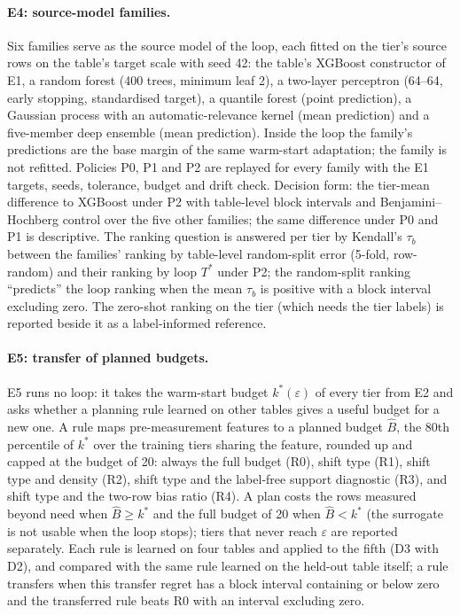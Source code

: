 \documentclass[11pt,a4paper]{article}
\begin{document}
\paragraph{E4: source-model families.} Six families serve as the source model of the loop, each
fitted on the tier's source rows on the table's target scale with seed 42: the table's XGBoost
constructor of E1, a random forest (400 trees, minimum leaf 2), a two-layer perceptron (64--64,
early stopping, standardised target), a quantile forest (point prediction), a Gaussian process with
an automatic-relevance kernel (mean prediction) and a five-member deep ensemble (mean prediction).
Inside the loop the family's predictions are the base margin of the same warm-start adaptation; the
family is not refitted. Policies P0, P1 and P2 are replayed for every family with the E1 targets,
seeds, tolerance, budget and drift check. Decision form: the tier-mean difference to XGBoost under
P2 with table-level block intervals and Benjamini--Hochberg control over the five other families; the
same difference under P0 and P1 is descriptive.
The ranking question is answered per tier by Kendall's $\tau_b$ between the families' ranking by
table-level random-split error (5-fold, row-random) and their ranking by loop $T^{*}$ under P2; the
random-split ranking ``predicts'' the loop ranking when the mean $\tau_b$ is positive with a block
interval excluding zero. The zero-shot ranking on the tier (which needs the tier labels) is reported
beside it as a label-informed reference.

\paragraph{E5: transfer of planned budgets.} E5 runs no loop: it takes the warm-start budget
$k^{*}(\varepsilon)$ of every tier from E2 and asks whether a planning rule learned on other tables
gives a useful budget for a new one. A rule maps pre-measurement features to a planned budget
$\hat B$, the 80th percentile of $k^{*}$ over the training tiers sharing the feature, rounded up and
capped at the budget of 20: always the full
budget (R0), shift type (R1), shift type and density (R2), shift type and the label-free support
diagnostic (R3), and shift type and the two-row bias ratio (R4). A plan costs the rows measured beyond
need when $\hat B \ge k^{*}$ and the full budget of 20 when $\hat B < k^{*}$ (the surrogate is not usable
when the loop stops); tiers that never reach $\varepsilon$ are reported separately. Each rule is learned
on four tables and applied to the fifth (D3 with D2), and compared with the same rule learned on the
held-out table itself; a rule transfers when this transfer regret has a block interval containing
or below zero and the transferred rule beats R0 with an interval excluding zero.
\end{document}
